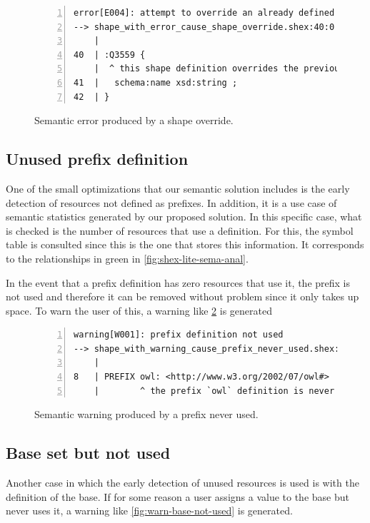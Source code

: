\begin{figure}
    \begin{lstlisting}[numbers=left,basicstyle=\ttfamily\scriptsize]
error[E004]: attempt to override an already defined shape
--> shape_with_error_cause_shape_override.shex:40:0
    |
40  | :Q3559 {
    |  ^ this shape definition overrides the previous one (17:0)
41  |   schema:name xsd:string ;
42  | }
    \end{lstlisting}
    \caption[Semantic error produced by a shape override]{Semantic error produced by a shape override.}
    \label{fig:err-override-shape}
\end{figure}

\subsection{Unused prefix definition}
One of the small optimizations that our semantic solution includes is the early detection of resources
not defined as prefixes. In addition, it is a use case of semantic statistics generated by our proposed
solution. In this specific case, what is checked is the number of resources that use a definition. For this,
the symbol table is consulted since this is the one that stores this information. It corresponds to the
relationships in green in \cref{fig:shex-lite-sema-anal}.

In the event that a prefix definition has zero resources that use it, the prefix is not used and therefore
it can be removed without problem since it only takes up space. To warn the user of this, a warning like \cref{fig:warn-pref-not-used}
is generated

\begin{figure}
    \begin{lstlisting}[numbers=left,basicstyle=\ttfamily\scriptsize]
warning[W001]: prefix definition not used
--> shape_with_warning_cause_prefix_never_used.shex:8:12
    |
8   | PREFIX owl: <http://www.w3.org/2002/07/owl#>
    |        ^ the prefix `owl` definition is never used
    \end{lstlisting}
    \caption[Semantic warning produced by a prefix never used]{Semantic warning produced by a prefix never used.}
    \label{fig:warn-pref-not-used}
\end{figure}

\subsection{Base set but not used}
Another case in which the early detection of unused resources is used is with the definition of the base.
If for some reason a user assigns a value to the base but never uses it, a warning like \cref{fig:warn-base-not-used}
is generated.

